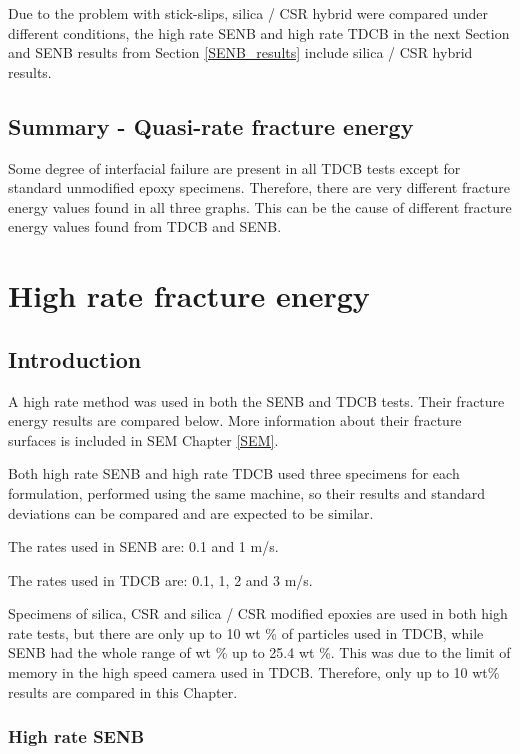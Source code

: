 \documentclass[numbers=noendperiod,chapterprefix=on]{icldt} %
\begin{document}
Due to the problem with stick-slips, silica / CSR hybrid were compared under different conditions, the high rate SENB and high rate TDCB in the next Section and SENB results from Section \ref{SENB_results} include silica / CSR hybrid results. 

\subsection{Summary - Quasi-rate fracture energy}
Some degree of interfacial failure are present in all TDCB tests except for standard unmodified epoxy specimens. Therefore, there are very different fracture energy values found in all three graphs. This can be the cause of different fracture energy values found from TDCB and SENB.

\section{High rate fracture energy}

\subsection{Introduction}
A high rate method was used in both the SENB and TDCB tests. Their fracture energy results are compared below. More information about their fracture surfaces is included in SEM Chapter \ref{SEM}.

Both high rate SENB and high rate TDCB used three specimens for each formulation, performed using the same machine, so their results and standard deviations can be compared and are expected to be similar.

The rates used in SENB are: 0.1 and 1 m/s. 

The rates used in TDCB are:  0.1, 1, 2 and 3 m/s.

Specimens of silica, CSR and silica / CSR modified epoxies are used in both high rate tests, but there are only up to 10 wt \% of particles used in TDCB, while SENB had the whole range of wt \% up to 25.4 wt \%. This was due to the limit of memory in the high speed camera used in TDCB.
Therefore, only up to 10 wt\% results are compared in this Chapter.

\subsubsection{High rate SENB}
\end{document}
